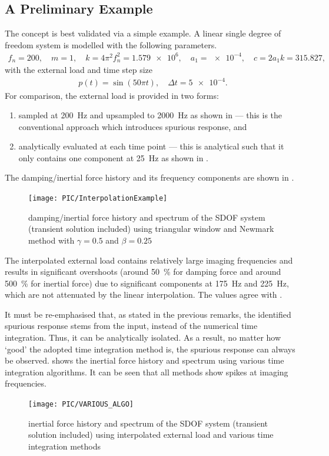 \subsection{A Preliminary Example}\label{sec:sdof_example}
The concept is best validated via a simple example. A linear single degree of freedom system is modelled with the following parameters.
\begin{gather}
f_n=200,\quad{}m=1,\quad{}k=4\pi^2f_n^2=\num{1.579e6},\quad{}a_1=\num{e-4},\quad{}c=2a_1k=\num{315.827},
\end{gather}
with the external load and time step size
\begin{gather}
p\left(t\right)=\sin\left(50\pi{}t\right),\quad\Delta{}t=\num{5e-4}.
\end{gather}
For comparison, the external load is provided in two forms:
\begin{enumerate}
\item sampled at \SI{200}{\hertz} and upsampled to \SI{2000}{\hertz} as shown in  --- this is the conventional approach which introduces spurious response, and
\item analytically evaluated at each time point --- this is analytical such that it only contains one component at \SI{25}{\hertz} as shown in .
\end{enumerate}
The damping/inertial force history and its frequency components are shown in .
\begin{figure}[htb!]
\centering
\texttt{[image: PIC/InterpolationExample]}
\caption{damping/inertial force history and spectrum of the SDOF system (transient solution included) using triangular window and Newmark method with $\gamma=0.5$ and $\beta=0.25$}\label{fig:sdof_force}
\end{figure}
The interpolated external load contains relatively large imaging frequencies and results in significant overshoots (around \SI{50}{\percent} for damping force and around \SI{500}{\percent} for inertial force) due to significant components at \SI{175}{\hertz} and \SI{225}{\hertz}, which are not attenuated by the linear interpolation. The values agree with .

It must be re-emphasised that, as stated in the previous remarks, the identified spurious response stems from the input, instead of the numerical time integration. Thus, it can be analytically isolated. As a result, no matter how `good' the adopted time integration method is, the spurious response can always be observed.  shows the inertial force history and spectrum using various time integration algorithms. It can be seen that all methods show spikes at imaging frequencies.
\begin{figure}[htb!]
\centering
\texttt{[image: PIC/VARIOUS\_ALGO]}
\caption{inertial force history and spectrum of the SDOF system (transient solution included) using interpolated external load and various time integration methods}\label{fig:sdof_various}
\end{figure}

